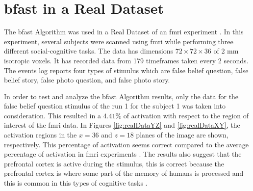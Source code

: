 \chapter{\texorpdfstring{\gls{bfast}}{BFAST} in a Real Dataset}

The \gls{bfast} Algorithm was used in a Real Dataset of an \gls{fmri} experiment \cite{moran2012social}. 
In this experiment, several subjects were scanned using \gls{fmri} while performing three different 
social-cognitive tasks. The data has dimensions $72\times72\times36$ of 2 mm isotropic voxels. It has 
recorded data from 179 timeframes taken every 2 seconds. The events log reports four types of stimulus 
which are false belief question, false belief story, false photo question, and false photo story.

In order to test and analyze the \gls{bfast} Algorithm results, only 
the data for the false belief question stimulus of the run 1 for the subject 1 was taken into 
consideration. This resulted in a $4.41\%$ of activation with respect to the region of interest 
of the \gls{fmri} data. In Figures \ref{fig:realDataYZ} and \ref{fig:realDataXY}, 
the activation regions in the $x=36$ and $z=18$ planes of the image are shown, respectively. 
This percentage of activation seems correct compared to the average percentage of activation in
\gls{fmri} experiments \cite{lazar2008statistical}. The results also suggest that the prefrontal 
cortex is active during the stimulus, this is correct because the prefrontal cortex is where some
part of the memory of humans is processed and this is common in this types of cognitive 
tasks \cite{amin2012brain}. 

